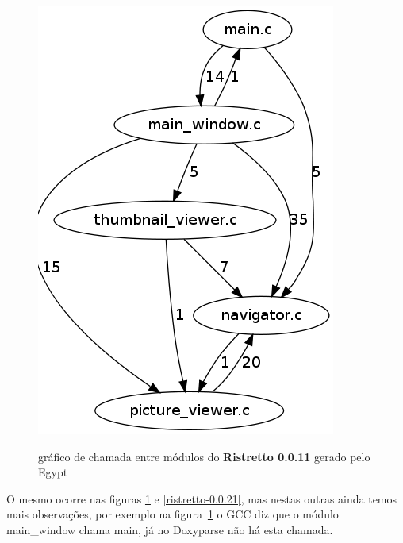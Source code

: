 \begin{figure}
{   \includegraphics[scale=0.5]{imagens/ristretto-0_0_11-gcc}
}
\caption{gráfico de chamada entre módulos do {\bf Ristretto 0.0.11} gerado pelo Egypt}
\label{ristretto-0.0.11}
\end{figure}

O mesmo ocorre nas figuras \ref{ristretto-0.0.11} e \ref{ristretto-0.0.21}, mas
nestas outras ainda temos mais observações, por exemplo na
figura~\ref{ristretto-0.0.11} o GCC diz que o módulo main\_window chama main,
já no Doxyparse não há esta chamada.

